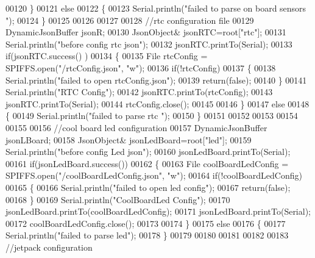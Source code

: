 \begin{DoxyCode}
00120     \}
00121     \textcolor{keywordflow}{else}
00122     \{
00123         Serial.println(\textcolor{stringliteral}{"failed to parse on board sensors "});    
00124     \}
00125     
00126     
00127     
00128     \textcolor{comment}{//rtc configuration file}
00129     DynamicJsonBuffer jsonR;
00130         JsonObject& jsonRTC=root[\textcolor{stringliteral}{"rtc"}];
00131     Serial.println(\textcolor{stringliteral}{"before config rtc json"});
00132     jsonRTC.printTo(Serial);
00133     \textcolor{keywordflow}{if}(jsonRTC.success() )
00134     \{
00135         File rtcConfig = SPIFFS.open(\textcolor{stringliteral}{"/rtcConfig.json"}, \textcolor{stringliteral}{"w"});   
00136         \textcolor{keywordflow}{if}(!rtcConfig)
00137         \{
00138             Serial.println(\textcolor{stringliteral}{"failed to open rtcConfig.json"});
00139             \textcolor{keywordflow}{return}(\textcolor{keyword}{false});
00140         \}
00141         Serial.println(\textcolor{stringliteral}{"RTC Config"});
00142         jsonRTC.printTo(rtcConfig);
00143         jsonRTC.printTo(Serial);
00144         rtcConfig.close();
00145     
00146     \}
00147     \textcolor{keywordflow}{else}
00148     \{
00149         Serial.println(\textcolor{stringliteral}{"failed to parse rtc "});
00150     \}
00151 
00152     
00153     
00154     
00155     
00156         \textcolor{comment}{//cool board led configuration}
00157     DynamicJsonBuffer jsonLBoard;
00158         JsonObject& jsonLedBoard=root[\textcolor{stringliteral}{"led"}];
00159     Serial.println(\textcolor{stringliteral}{"before config Led json"});
00160     jsonLedBoard.printTo(Serial);
00161     \textcolor{keywordflow}{if}(jsonLedBoard.success())
00162     \{   
00163         File coolBoardLedConfig = SPIFFS.open(\textcolor{stringliteral}{"/coolBoardLedConfig.json"}, \textcolor{stringliteral}{"w"}); 
00164         \textcolor{keywordflow}{if}(!coolBoardLedConfig)
00165         \{
00166             Serial.println(\textcolor{stringliteral}{"failed to open led config"});
00167             \textcolor{keywordflow}{return}(\textcolor{keyword}{false});
00168         \}
00169         Serial.println(\textcolor{stringliteral}{"CoolBoardLed Config"});
00170         jsonLedBoard.printTo(coolBoardLedConfig);
00171         jsonLedBoard.printTo(Serial);
00172         coolBoardLedConfig.close();
00173     
00174     \}
00175     \textcolor{keywordflow}{else}
00176     \{
00177         Serial.println(\textcolor{stringliteral}{"failed to parse led"});
00178     \}
00179         
00180 
00181     
00182 
00183     \textcolor{comment}{//jetpack configuration}

\end{DoxyCode}
